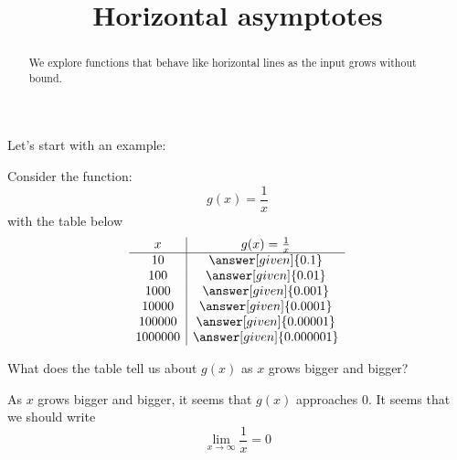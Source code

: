 \documentclass{ximera}
\title[Dig-In:]{Horizontal asymptotes}
\begin{document}
\begin{abstract}
We explore functions that behave like horizontal lines as the input
grows without bound.
\end{abstract}
\maketitle

Let's start with an example:
\begin{example}
Consider the function:
\[
g(x) = \frac{1}{x}
\]
with the table below
\[
\begin{array}{c|c}
x       & g(x)=\frac{1}{x} \\\hline
10      & \answer[given]{0.1} \\ 
100     & \answer[given]{0.01} \\
1000    & \answer[given]{0.001} \\
10000   & \answer[given]{0.0001} \\
100000  & \answer[given]{0.00001}\\
1000000 & \answer[given]{0.000001}
\end{array}
\]

  What does the table tell us about $g(x)$ as $x$ grows bigger and bigger?
  \begin{explanation}
    
As $x$ grows bigger and bigger, it seems that $g(x)$ approaches $0$. It seems that we should write
\[
 \lim_{x\to \infty}\frac{1}{x}=0 
 \]
  \end{explanation}
\end{example}
\end{document}
